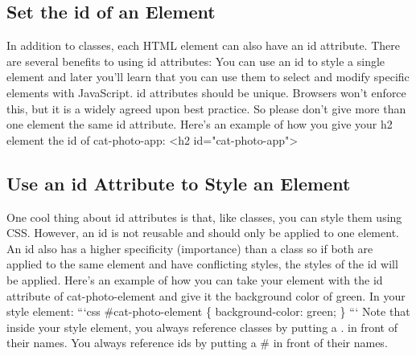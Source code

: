 \documentclass{article}%
\begin{document}
%
\subsection{Set the id of an Element}%
\label{subsec:SettheidofanElement}%
In addition to classes, each HTML element can also have an id attribute.\newline%
There are several benefits to using id attributes: You can use an id to style a single element and later you'll learn that you can use them to select and modify specific elements with JavaScript.\newline%
id attributes should be unique. Browsers won't enforce this, but it is a widely agreed upon best practice. So please don't give more than one element the same id attribute.\newline%
Here's an example of how you give your h2 element the id of cat{-}photo{-}app:\newline%
<h2 id="cat{-}photo{-}app">\newline%

%
\subsection{Use an id Attribute to Style an Element}%
\label{subsec:UseanidAttributetoStyleanElement}%
One cool thing about id attributes is that, like classes, you can style them using CSS.\newline%
However, an id is not reusable and should only be applied to one element. An id also has a higher specificity (importance) than a class so if both are applied to the same element and have conflicting styles, the styles of the id will be applied.\newline%
Here's an example of how you can take your element with the id attribute of cat{-}photo{-}element and give it the background color of green. In your style element:\newline%
```css\newline%
\#cat{-}photo{-}element \{\newline%
  background{-}color: green;\newline%
\}\newline%
```\newline%
Note that inside your style element, you always reference classes by putting a . in front of their names. You always reference ids by putting a \# in front of their names.\newline%

%
\end{document}
